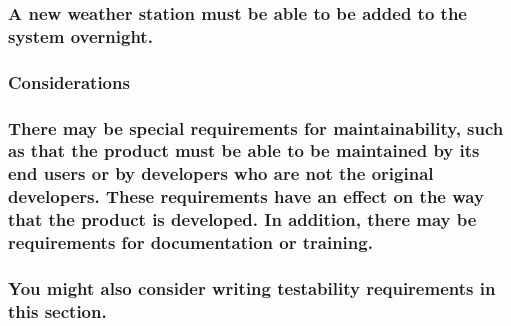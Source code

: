 \documentclass[
]{article}
\begin{document}
\hypertarget{a-new-weather-station-must-be-able-to-be-added-to-the-system-overnight.}{%
\subsubsection{A new weather station must be able to be added to the
system
overnight.}\label{a-new-weather-station-must-be-able-to-be-added-to-the-system-overnight.}}

\hypertarget{considerations-33}{%
\subsubsection{Considerations}\label{considerations-33}}

\hypertarget{there-may-be-special-requirements-for-maintainability-such-as-that-the-product-must-be-able-to-be-maintained-by-its-end-users-or-by-developers-who-are-not-the-original-developers.-these-requirements-have-an-effect-on-the-way-that-the-product-is-developed.-in-addition-there-may-be-requirements-for-documentation-or-training.}{%
\subsubsection{\texorpdfstring{There may be special requirements for
maintainability, such as that the product must be able to be maintained
by its end users or by developers who are not the original developers.
These requirements have an effect on the way that the product is
developed. In addition, there may be requirements for documentation or
training.
}{There may be special requirements for maintainability, such as that the product must be able to be maintained by its end users or by developers who are not the original developers. These requirements have an effect on the way that the product is developed. In addition, there may be requirements for documentation or training. }}\label{there-may-be-special-requirements-for-maintainability-such-as-that-the-product-must-be-able-to-be-maintained-by-its-end-users-or-by-developers-who-are-not-the-original-developers.-these-requirements-have-an-effect-on-the-way-that-the-product-is-developed.-in-addition-there-may-be-requirements-for-documentation-or-training.}}

\hypertarget{you-might-also-consider-writing-testability-requirements-in-this-section.}{%
\subsubsection{\texorpdfstring{You might also consider writing
testability requirements in this section.
}{You might also consider writing testability requirements in this section. }}\label{you-might-also-consider-writing-testability-requirements-in-this-section.}}
\end{document}
